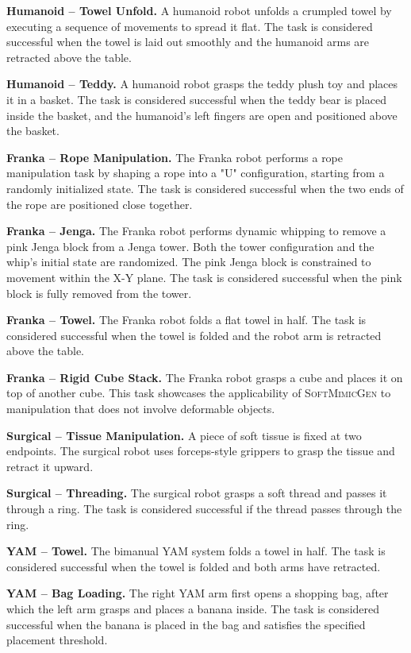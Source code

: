 \documentclass[letterpaper, 10 pt, conference]{ieeeconf}  %
\newcommand{\sysName}{\textsc{SoftMimicGen}\xspace}
\begin{document}
\noindent \textbf{Humanoid -- Towel Unfold.} A humanoid robot unfolds a crumpled towel by executing a sequence of movements to spread it flat. The task is considered successful when the towel is laid out smoothly and the humanoid arms are retracted above the table.


\noindent \textbf{Humanoid -- Teddy.} A humanoid robot grasps the teddy plush toy and places it in a basket. The task is considered successful when the teddy bear is placed inside the basket, and the humanoid's left fingers are open and positioned above the basket.


\noindent \textbf{Franka -- Rope Manipulation.} The Franka robot performs a rope manipulation task by shaping a rope into a "U" configuration, starting from a randomly initialized state. The task is considered successful when the two ends of the rope are positioned close together.


\noindent \textbf{Franka -- Jenga.} The Franka robot performs dynamic whipping to remove a pink Jenga block from a Jenga tower. Both the tower configuration and the whip's initial state are randomized. The pink Jenga block is constrained to movement within the X-Y plane. The task is considered successful when the pink block is fully removed from the tower.


\noindent \textbf{Franka -- Towel.} The Franka robot folds a flat towel in half. The task is considered successful when the towel is folded and the robot arm is retracted above the table.


\noindent \textbf{Franka -- Rigid Cube Stack.} The Franka robot grasps a cube and places it on top of another cube. This task showcases the applicability of \sysName to manipulation that does not involve deformable objects.


\noindent \textbf{Surgical -- Tissue Manipulation.} A piece of soft tissue is fixed at two endpoints. The surgical robot uses forceps-style grippers to grasp the tissue and retract it upward.


\noindent \textbf{Surgical -- Threading.} The surgical robot grasps a soft thread and passes it through a ring. The task is considered successful if the thread passes through the ring.


\noindent \textbf{YAM -- Towel.} The bimanual YAM system folds a towel in half. The task is considered successful when the towel is folded and both arms have retracted.


\noindent \textbf{YAM -- Bag Loading.} The right YAM arm first opens a shopping bag, after which the left arm grasps and places a banana inside. The task is considered successful when the banana is placed in the bag and satisfies the specified placement threshold.
\end{document}
